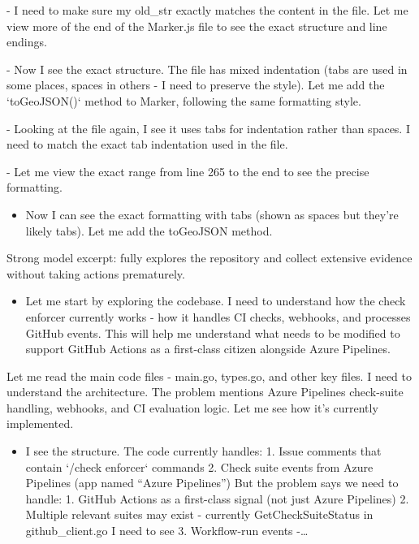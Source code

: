 \documentclass[
  10
]{article}
\providecommand{\tightlist}{%
  \setlength{\itemsep}{0pt}\setlength{\parskip}{0pt}}
\begin{document}
- I need to make sure my old\_str exactly matches the content in the
file. Let me view more of the end of the Marker.js file to see the exact
structure and line endings.

- Now I see the exact structure. The file has mixed indentation (tabs
are used in some places, spaces in others - I need to preserve the
style). Let me add the `toGeoJSON()` method to Marker, following the
same formatting style.

- Looking at the file again, I see it uses tabs for indentation rather
than spaces. I need to match the exact tab indentation used in the file.

- Let me view the exact range from line 265 to the end to see the
precise formatting.

\begin{itemize}
\tightlist
\item
  Now I can see the exact formatting with tabs (shown as spaces but
  they're likely tabs). Let me add the toGeoJSON method.
\end{itemize}

Strong model excerpt: fully explores the repository and collect
extensive evidence without taking actions prematurely.

\begin{itemize}
\tightlist
\item
  Let me start by exploring the codebase. I need to understand how the
  check enforcer currently works - how it handles CI checks, webhooks,
  and processes GitHub events. This will help me understand what needs
  to be modified to support GitHub Actions as a first-class citizen
  alongside Azure Pipelines.
\end{itemize}

Let me read the main code files - main.go, types.go, and other key
files. I need to understand the architecture. The problem mentions Azure
Pipelines check-suite handling, webhooks, and CI evaluation logic. Let
me see how it's currently implemented.

\begin{itemize}
\tightlist
\item
  I see the structure. The code currently handles: 1. Issue comments
  that contain `/check enforcer` commands 2. Check suite events from
  Azure Pipelines (app named ``Azure Pipelines'') But the problem says
  we need to handle: 1. GitHub Actions as a first-class signal (not just
  Azure Pipelines) 2. Multiple relevant suites may exist - currently
  GetCheckSuiteStatus in github\_client.go I need to see 3. Workflow-run
  events -\ldots{}
\end{itemize}
\end{document}
